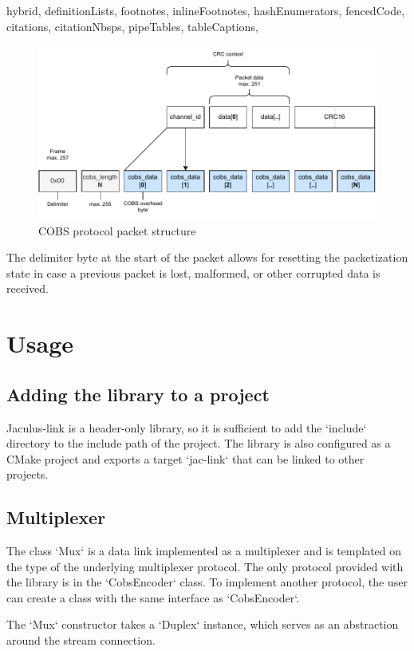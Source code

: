 \begin{markdown*}{%
  hybrid,
  definitionLists,
  footnotes,
  inlineFootnotes,
  hashEnumerators,
  fencedCode,
  citations,
  citationNbsps,
  pipeTables,
  tableCaptions,
}
\begin{figure}[ht]
    \centering
    \includegraphics[width=\textwidth]{img/cobs-diagram}
    \caption{COBS protocol packet structure}
    \label{fig:cobs-diagram}
\end{figure}

The delimiter byte at the start of the packet allows for resetting the packetization state in case a previous packet is lost, malformed, or other corrupted data is received.


\section{Usage}

\subsection{Adding the library to a project}

Jaculus-link is a header-only library, so it is sufficient to add the `include` directory to the include path of the project. The library is also configured as a CMake project and exports a target `jac-link` that can be linked to other projects.

\subsection{Multiplexer}

The class `Mux` is a data link implemented as a multiplexer and is templated on the type of the underlying multiplexer protocol. The only protocol provided with the library is in the `CobsEncoder` class. To implement another protocol, the user can create a class with the same interface as `CobsEncoder`.

The `Mux` constructor takes a `Duplex` instance, which serves as an abstraction around the stream connection.


\end{markdown*}
